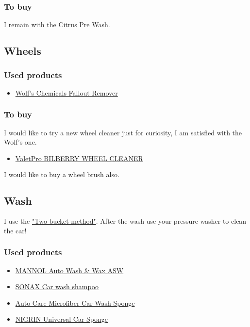 \documentclass[12pt, a4paper, portrait]{article}
\begin{document}
\subsubsection{To buy}
I remain with the Citrus Pre Wash.

\subsection{Wheels}
\subsubsection{Used products}
\begin{itemize}
\item{\href{http://wolfschemicals.com/shop/wheel/Fallout_Remover_1L}{Wolf's Chemicals Fallout Remover}}
\end{itemize}
\subsubsection{To buy}
I would like to try a new wheel cleaner just for curiosity, I am satisfied with the Wolf's one.
\begin{itemize}
\item{\href{https://www.valetpro.eu/Wheel-Cleaners/56-/Bilberry-Wheel-Cleaner}{ValetPro BILBERRY WHEEL CLEANER}}
\end{itemize}
\par I would like to buy a wheel brush also.

\subsection{Wash}
I use the \href{https://www.youtube.com/watch?v=ZVAxphcgKnY}{"Two bucket method"}. After the wash use your pressure washer to clean the car!
\subsubsection{Used products}
\begin{itemize}
\item{\href{https://mannol.de/en/?action=accessory_chemical_preview\&name=9809\%20Auto\%20Wash\%26Wax}{MANNOL Auto Wash \& Wax ASW}}
\item{\href{https://www.sonax.com/Product-Search/(location)/12902-SONAX-Car-wash-shampoo}{SONAX Car wash shampoo}}
\item{\href{https://www.aliexpress.com/store/product/New-Auto-Care-2IN1-Car-Wash-Sponge-Mixed-Ultrafine-Fiber-Microfiber-Chenille-Anthozoan-Mesh-for-Washing/1489256_32216308401.html}{Auto Care Microfiber Car Wash Sponge}}
\item{\href{https://www.nigrin.com/produkte/71454/NIGRIN-Universal-Autoschwamm}{NIGRIN Universal Car Sponge}}
\end{itemize}
\end{document}
